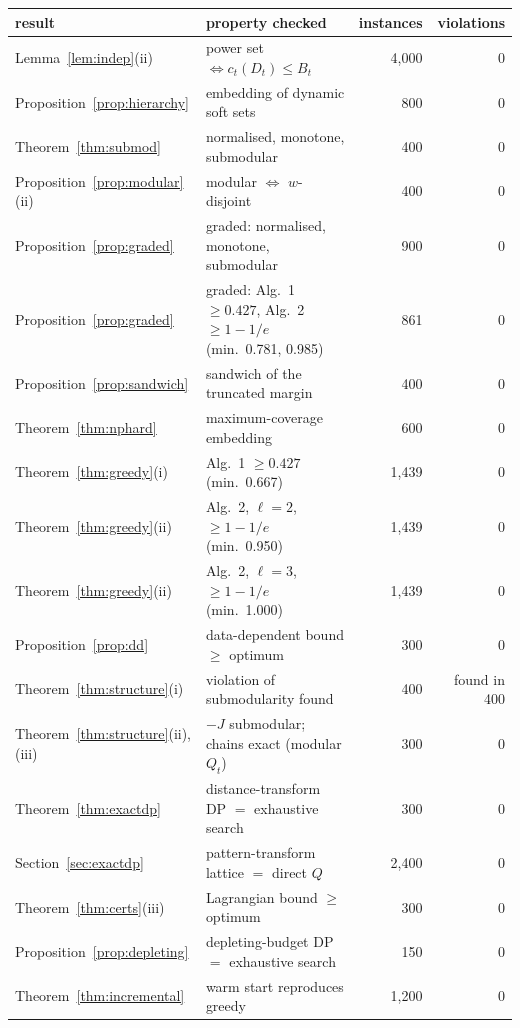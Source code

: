 \begin{tabular}{llrr}
\toprule
result & property checked & instances & violations \\
\midrule
Lemma~\ref{lem:indep}(ii) & power set $\iff c_t(D_t)\le B_t$ & 4{,}000 & 0 \\
Proposition~\ref{prop:hierarchy} & embedding of dynamic soft sets & 800 & 0 \\
Theorem~\ref{thm:submod} & normalised, monotone, submodular & 400 & 0 \\
Proposition~\ref{prop:modular}(ii) & modular $\iff$ $w$-disjoint & 400 & 0 \\
Proposition~\ref{prop:graded} & graded: normalised, monotone, submodular & 900 & 0 \\
Proposition~\ref{prop:graded} & graded: Alg.~1 $\ge0.427$, Alg.~2 $\ge1-1/e$ (min.\ 0.781, 0.985) & 861 & 0 \\
Proposition~\ref{prop:sandwich} & sandwich of the truncated margin & 400 & 0 \\
Theorem~\ref{thm:nphard} & maximum-coverage embedding & 600 & 0 \\
Theorem~\ref{thm:greedy}(i) & Alg.~1 $\ge0.427$ (min.\ 0.667) & 1{,}439 & 0 \\
Theorem~\ref{thm:greedy}(ii) & Alg.~2, $\ell=2$, $\ge1-1/e$ (min.\ 0.950) & 1{,}439 & 0 \\
Theorem~\ref{thm:greedy}(ii) & Alg.~2, $\ell=3$, $\ge1-1/e$ (min.\ 1.000) & 1{,}439 & 0 \\
Proposition~\ref{prop:dd} & data-dependent bound $\ge$ optimum & 300 & 0 \\
Theorem~\ref{thm:structure}(i) & violation of submodularity found & 400 & found in 400 \\
Theorem~\ref{thm:structure}(ii),(iii) & $-J$ submodular; chains exact (modular $Q_t$) & 300 & 0 \\
Theorem~\ref{thm:exactdp} & distance-transform DP $=$ exhaustive search & 300 & 0 \\
Section~\ref{sec:exactdp} & pattern-transform lattice $=$ direct $Q$ & 2{,}400 & 0 \\
Theorem~\ref{thm:certs}(iii) & Lagrangian bound $\ge$ optimum & 300 & 0 \\
Proposition~\ref{prop:depleting} & depleting-budget DP $=$ exhaustive search & 150 & 0 \\
Theorem~\ref{thm:incremental} & warm start reproduces greedy & 1{,}200 & 0 \\
\bottomrule
\end{tabular}